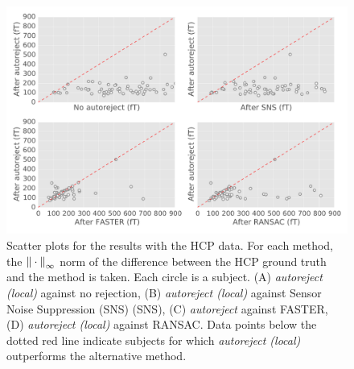 \begin{figure}[htb]
    \centering
    \includegraphics[width=\linewidth]{figures/figure4.pdf}
    \caption[]{Scatter plots for the results with the HCP data. For each method, the ${\| \cdot \|}_{\mathrm{\infty}}$ norm of the difference between the HCP ground truth and the method is taken. Each circle is a subject. (A) \textit{autoreject (local)} against no rejection, (B) \textit{autoreject (local)} against Sensor Noise Suppression (SNS) (SNS), (C) \textit{autoreject} against FASTER, (D) \textit{autoreject (local)} against RANSAC. Data points below the dotted red line indicate subjects for which \textit{autoreject (local)} outperforms the alternative method.}
    \label{fig:sommaire:hcp_scatter}
\end{figure}

